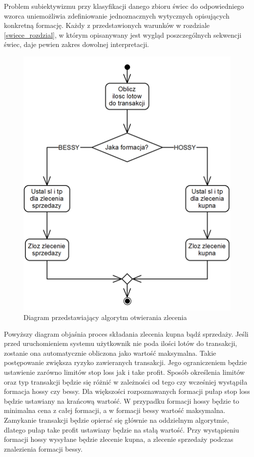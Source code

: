 \documentclass[pdflatex,11pt]{aghdpl}
\begin{document}
Problem subiektywizmu przy klasyfikacji danego zbioru świec do odpowiedniego wzorca uniemożliwia zdefiniowanie jednoznacznych wytycznych opisujących konkretną formację. Każdy z przedstawionych warunków w rozdziale \ref{swiece_rozdzial}, w którym opisanywany jest wygląd poszczególnych sekwencji świec, daje pewien zakres dowolnej interpretacji. 

\begin{figure}[H]
\begin{center}
\includegraphics[width=12cm]{otwarcie.png}
\caption{Diagram przedstawiający algorytm otwierania zlecenia}
\label{otwarcie}
\end{center}
\end{figure} 

Powyższy diagram objaśnia proces składania zlecenia kupna bądź sprzedaży. Jeśli przed uruchomieniem systemu użytkownik nie poda ilości lotów do transakcji, zostanie ona automatycznie obliczona jako wartość maksymalna. Takie postępowanie zwiększa ryzyko zawieranych transakcji. Jego ograniczeniem będzie ustawienie zarówno limitów stop loss jak i take profit. Sposób określenia limitów oraz typ transakcji będzie się różnić w zależności od tego czy wcześniej wystąpiła formacja hossy czy bessy. Dla większości rozpoznawanych formacji pułap stop loss będzie ustawiany na krańcową wartość. W przypadku formacji hossy będzie to minimalna cena z całej formacji, a w formacji bessy wartość maksymalna. Zamykanie transakcji będzie opierać się głównie na oddzielnym algorytmie, dlatego pułap take profit ustawiany będzie na stałą wartość. Przy wystąpieniu formacji hossy wysyłane będzie zlecenie kupna, a zlecenie sprzedaży podczas znalezienia formacji bessy. 
\end{document}

